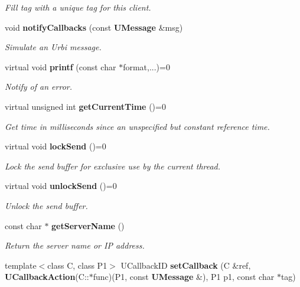\begin{CompactItemize}
\begin{CompactList}\small\item\em Fill tag with a unique tag for this client. \item\end{CompactList}\item 
void {\bf notify\-Callbacks} (const {\bf UMessage} \&msg)
\begin{CompactList}\small\item\em Simulate an Urbi message. \item\end{CompactList}\item 
virtual void {\bf printf} (const char $\ast$format,...)=0\label{classUAbstractClient_a31}

\begin{CompactList}\small\item\em Notify of an error. \item\end{CompactList}\item 
virtual unsigned int {\bf get\-Current\-Time} ()=0\label{classUAbstractClient_a32}

\begin{CompactList}\small\item\em Get time in milliseconds since an unspecified but constant reference time. \item\end{CompactList}\item 
virtual void {\bf lock\-Send} ()=0\label{classUAbstractClient_a33}

\begin{CompactList}\small\item\em Lock the send buffer for exclusive use by the current thread. \item\end{CompactList}\item 
virtual void {\bf unlock\-Send} ()=0\label{classUAbstractClient_a34}

\begin{CompactList}\small\item\em Unlock the send buffer. \item\end{CompactList}\item 
const char $\ast$ {\bf get\-Server\-Name} ()\label{classUAbstractClient_a35}

\begin{CompactList}\small\item\em Return the server name or IP address. \item\end{CompactList}\item 
template$<$class C, class P1$>$ UCallback\-ID {\bf set\-Callback} (C \&ref, {\bf UCallback\-Action}(C::$\ast$func)(P1, const {\bf UMessage} \&), P1 p1, const char $\ast$tag)\label{classUAbstractClient_a36}


\end{CompactItemize}
